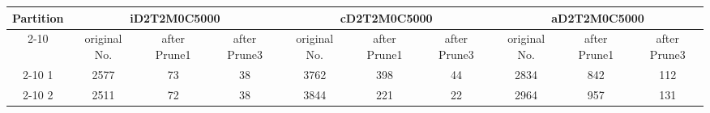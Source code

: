 \begin{table*}[t]
  \centering
\makeatletter
    \long{}
\makeatother
  \caption{2 partitions}
    \vspace*{3pt}
  \footnotesize

  \label{table:partition4}
  \begin{tabular}{|c||c|c|c|c|c|c|c|c|c|}
  \hline
  \multirow{2}{*}{Partition} &  \multicolumn{3}{|c|}{iD2T2M0C5000} & \multicolumn{3}{|c|}{cD2T2M0C5000} &\multicolumn{3}{|c|}{aD2T2M0C5000} \\\cline{2-10}
    &  original No. & after Prune1 & after Prune3 & original No. & after Prune1 & after Prune3 & original No. & after Prune1 & after Prune3\\\hline\hline

\cline{2-10}
    1 &  2577 & 73 & 38 & 3762 & 398 & 44 & 2834 & 842 & 112 \\\hline

\cline{2-10}
    2 &  2511 & 72 & 38 & 3844 & 221 & 22 & 2964 & 957 & 131 \\\hline
    
  \end{tabular}
  \vspace*{-17pt}
\end{table*}



